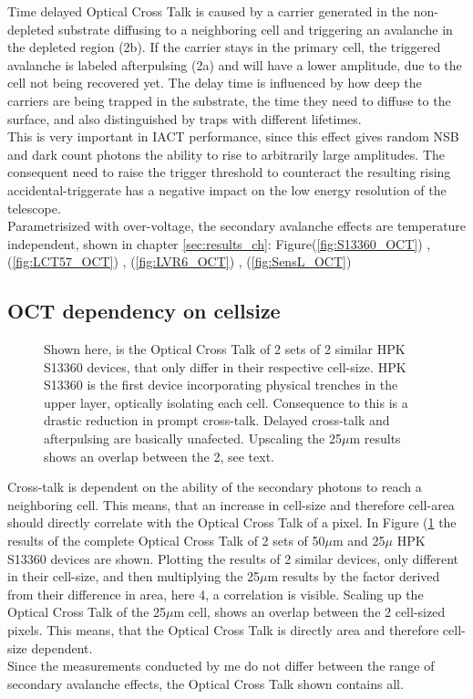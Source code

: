 \documentclass[12pt,article,type=msc,colorback,accentcolor=tud9c]{tudthesis}
\begin{document}
Time delayed Optical Cross Talk is caused by a carrier generated in the non-depleted substrate diffusing to a neighboring cell and triggering an avalanche in the depleted region (2b). If the carrier stays in the primary cell, the triggered avalanche is labeled afterpulsing (2a) and will have a lower amplitude, due to the cell not being recovered yet. The delay time is influenced by how deep the carriers are being trapped in the substrate, the time they need to diffuse to the surface, and also distinguished by traps with different lifetimes.\\
This is very important in IACT performance, since this effect gives random NSB and dark count photons the ability to rise to arbitrarily large amplitudes. The consequent need to raise the trigger threshold to counteract the resulting rising accidental-triggerate has a negative impact on the low energy resolution of the telescope.\\
Parametrisized with over-voltage, the secondary avalanche effects are temperature independent, shown in chapter \ref{sec:results_ch}: Figure(\ref{fig:S13360_OCT}) , (\ref{fig:LCT57_OCT}) , (\ref{fig:LVR6_OCT}) , (\ref{fig:SensL_OCT})\\


\subsection{OCT dependency on cellsize}
\begin{figure}[h]
\begin{centering}
\caption{Shown here, is the Optical Cross Talk of 2 sets of 2 similar HPK S13360 devices, that only differ in their respective cell-size. HPK S13360 is the first device incorporating physical trenches in the upper layer, optically isolating each cell. Consequence to this is a drastic reduction in prompt cross-talk. Delayed cross-talk and afterpulsing are basically unafected. Upscaling the 25$\mu$m results shows an overlap between the 2, see text.}
\label{fig:cell-size}
\end{centering}
\end{figure}
Cross-talk is dependent on the ability of the secondary photons to reach a neighboring cell. This means, that an increase in cell-size and therefore cell-area should directly correlate with the Optical Cross Talk of a pixel. In Figure (\ref{fig:cell-size} the results of the complete Optical Cross Talk of 2 sets of 50$\mu$m and 25$\mu$ HPK S13360 devices are shown. Plotting the results of 2 similar devices, only different in their cell-size, and then multiplying the 25$\mu$m results by the factor derived from their difference in area, here 4, a correlation is visible. Scaling up the Optical Cross Talk of the 25$\mu$m cell, shows an overlap between the 2 cell-sized pixels. This means, that the Optical Cross Talk is directly area and therefore cell-size dependent.\\
Since the measurements conducted by me do not differ between the range of secondary avalanche effects, the Optical Cross Talk shown contains all.
\end{document}
